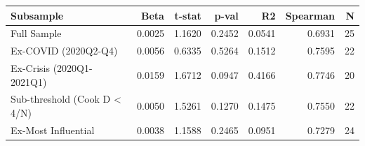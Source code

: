 \begin{tabular}{lrrrrrr}
\toprule
Subsample & Beta & t-stat & p-val & R2 & Spearman & N \\
\midrule
Full Sample & 0.0025 & 1.1620 & 0.2452 & 0.0541 & 0.6931 & 25 \\
Ex-COVID (2020Q2-Q4) & 0.0056 & 0.6335 & 0.5264 & 0.1512 & 0.7595 & 22 \\
Ex-Crisis (2020Q1-2021Q1) & 0.0159 & 1.6712 & 0.0947 & 0.4166 & 0.7746 & 20 \\
Sub-threshold (Cook D < 4/N) & 0.0050 & 1.5261 & 0.1270 & 0.1475 & 0.7550 & 22 \\
Ex-Most Influential & 0.0038 & 1.1588 & 0.2465 & 0.0951 & 0.7279 & 24 \\
\bottomrule
\end{tabular}
